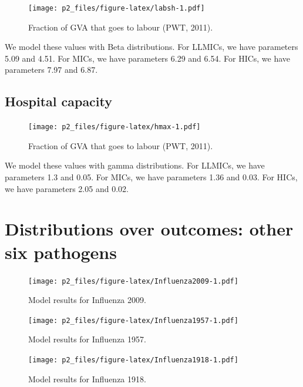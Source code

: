 \documentclass[
]{article}
\begin{document}
\begin{figure}
\centering
\texttt{[image: p2\_files/figure-latex/labsh-1.pdf]}
\caption{\label{fig:labsh}Fraction of GVA that goes to labour (PWT, 2011).}
\end{figure}

We model these values with Beta distributions. For LLMICs, we have parameters 5.09 and 4.51. For MICs, we have parameters 6.29 and 6.54. For HICs, we have parameters 7.97 and 6.87.

\newpage

\hypertarget{hospital-capacity}{%
\subsection{Hospital capacity}\label{hospital-capacity}}

\begin{figure}
\centering
\texttt{[image: p2\_files/figure-latex/hmax-1.pdf]}
\caption{\label{fig:hmax}Fraction of GVA that goes to labour (PWT, 2011).}
\end{figure}

We model these values with gamma distributions. For LLMICs, we have parameters 1.3 and 0.05. For MICs, we have parameters 1.36 and 0.03. For HICs, we have parameters 2.05 and 0.02.

\newpage

\hypertarget{distributions-over-outcomes-other-six-pathogens}{%
\section{Distributions over outcomes: other six pathogens}\label{distributions-over-outcomes-other-six-pathogens}}

\begin{figure}
\centering
\texttt{[image: p2\_files/figure-latex/Influenza2009-1.pdf]}
\caption{\label{fig:Influenza2009}Model results for Influenza 2009.}
\end{figure}

\begin{figure}
\centering
\texttt{[image: p2\_files/figure-latex/Influenza1957-1.pdf]}
\caption{\label{fig:Influenza1957}Model results for Influenza 1957.}
\end{figure}

\begin{figure}
\centering
\texttt{[image: p2\_files/figure-latex/Influenza1918-1.pdf]}
\caption{\label{fig:Influenza1918}Model results for Influenza 1918.}
\end{figure}
\end{document}
